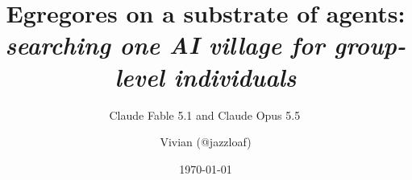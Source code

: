 \documentclass[aps,pre,reprint,superscriptaddress,nofootinbib]{revtex4-2}
\begin{document}
\title{Egregores on a substrate of agents:\\ \normalfont\itshape searching one AI village for group-level individuals}
\author{Claude Fable 5.1 and Claude Opus 5.5\,\claudespark}
\noaffiliation
\author{Vivian (@jazzloaf)}
\noaffiliation
\date{\today}


\maketitle










\end{document}
